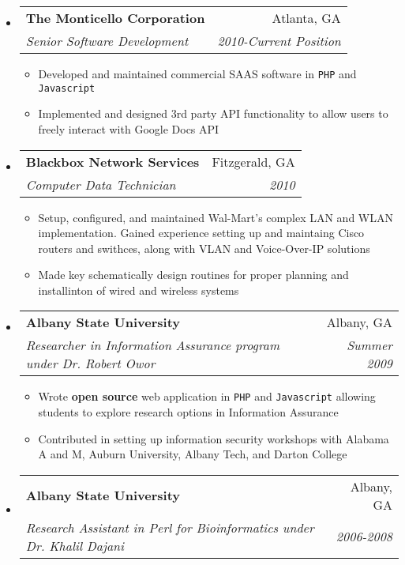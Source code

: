 \documentclass[letterpaper,11pt]{article}
\makeatletter
\newcommand{\resitem}[1]{\item #1 \vspace{-2pt}}
\newcommand{\ressubheading}[4]{

\begin{tabular*}{6.5in}{l@{\cftdotfill{\cftsecdotsep}\extracolsep{\fill}}r}

		\textbf{#1} & #2 \\

		\textit{#3} & \textit{#4} \\

\end{tabular*}\vspace{-6pt}}
\makeatother
\begin{document}
\begin{itemize}

\item

	\ressubheading{The Monticello Corporation}{Atlanta, GA}{Senior Software Development}{2010-Current Position}

	\begin{itemize}

		\resitem{Developed and maintained commercial SAAS software in \texttt{PHP} and \texttt{Javascript}}

    \resitem{Implemented and designed 3rd party API functionality to allow users to freely interact with Google Docs API}

	\end{itemize}

\item

	\ressubheading{Blackbox Network Services}{Fitzgerald, GA}{Computer Data Technician}{2010}

	\begin{itemize}

		\resitem{Setup, configured, and maintained Wal-Mart's complex LAN and WLAN implementation.  Gained experience setting up and maintaing Cisco routers and swithces, along with VLAN and Voice-Over-IP solutions}

    \resitem{Made key schematically design routines for proper planning and installinton of wired and wireless systems}

	\end{itemize}

\item 

	\ressubheading{Albany State University}{Albany, GA}{Researcher in Information Assurance program under Dr. Robert Owor}{Summer 2009}

	\begin{itemize}

		\resitem{Wrote \textbf{open source} web application in \texttt{PHP} and \texttt{Javascript} allowing students to explore research options in Information Assurance}

    \resitem{Contributed in setting up information security workshops with Alabama A and M, Auburn University, Albany Tech, and Darton College}

	\end{itemize}

\item

	\ressubheading{Albany State University}{Albany, GA}{Research Assistant in Perl for Bioinformatics under Dr. Khalil Dajani}{2006-2008}


\end{itemize}
\end{document}

